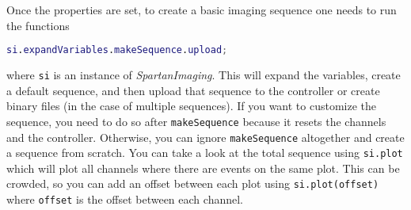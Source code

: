 \documentclass[]{article}
\begin{document}
Once the properties are set, to create a basic imaging sequence one needs to run the functions
\begin{lstlisting}[language=matlab]
si.expandVariables.makeSequence.upload;
\end{lstlisting}
where \verb|si| is an instance of \emph{SpartanImaging}.  This will expand the variables, create a default sequence, and then upload that sequence to the controller or create binary files (in the case of multiple sequences).  If you want to customize the sequence, you need to do so after \verb|makeSequence| because it resets the channels and the controller.  Otherwise, you can ignore \verb|makeSequence| altogether and create a sequence from scratch.  You can take a look at the total sequence using \verb|si.plot| which will plot all channels where there are events on the same plot.  This can be crowded, so you can add an offset between each plot using \verb|si.plot(offset)| where \verb|offset| is the offset between each channel.
\end{document}
